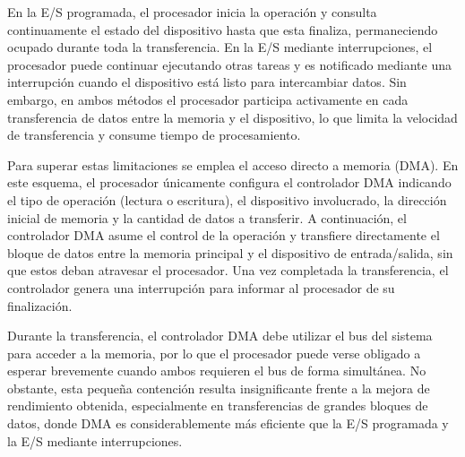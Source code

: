 En la E/S programada, el procesador inicia la operación y consulta continuamente el estado del dispositivo hasta que esta finaliza, permaneciendo ocupado durante toda la transferencia. En la E/S mediante interrupciones, el procesador puede continuar ejecutando otras tareas y es notificado mediante una interrupción cuando el dispositivo está listo para intercambiar datos. Sin embargo, en ambos métodos el procesador participa activamente en cada transferencia de datos entre la memoria y el dispositivo, lo que limita la velocidad de transferencia y consume tiempo de procesamiento.

Para superar estas limitaciones se emplea el acceso directo a memoria (DMA). En este esquema, el procesador únicamente configura el controlador DMA indicando el tipo de operación (lectura o escritura), el dispositivo involucrado, la dirección inicial de memoria y la cantidad de datos a transferir. A continuación, el controlador DMA asume el control de la operación y transfiere directamente el bloque de datos entre la memoria principal y el dispositivo de entrada/salida, sin que estos deban atravesar el procesador. Una vez completada la transferencia, el controlador genera una interrupción para informar al procesador de su finalización.

Durante la transferencia, el controlador DMA debe utilizar el bus del sistema para acceder a la memoria, por lo que el procesador puede verse obligado a esperar brevemente cuando ambos requieren el bus de forma simultánea. No obstante, esta pequeña contención resulta insignificante frente a la mejora de rendimiento obtenida, especialmente en transferencias de grandes bloques de datos, donde DMA es considerablemente más eficiente que la E/S programada y la E/S mediante interrupciones.
